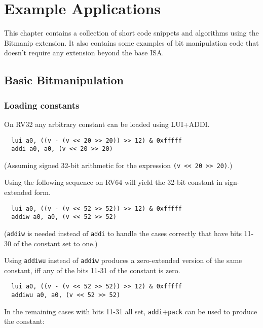 \chapter{Example Applications}

This chapter contains a collection of short code snippets and algorithms using
the Bitmanip extension. It also contains some examples of bit manipulation
code that doesn't require any extension beyond the base ISA.


\section{Basic Bitmanipulation}


\subsection{Loading constants}

On RV32 any arbitrary constant can be loaded using LUI+ADDI.

\begin{verbatim}
  lui a0, ((v - (v << 20 >> 20)) >> 12) & 0xfffff
  addi a0, a0, (v << 20 >> 20)
\end{verbatim}

(Assuming signed 32-bit arithmetic for the expression {\tt (v << 20 >> 20)}.)

Using the following sequence on RV64 will yield the 32-bit constant in sign-extended
form.

\begin{verbatim}
  lui a0, ((v - (v << 52 >> 52)) >> 12) & 0xfffff
  addiw a0, a0, (v << 52 >> 52)
\end{verbatim}

({\tt addiw} is needed instead of {\tt addi} to handle the cases correctly that have
bits 11-30 of the constant set to one.)

Using {\tt addiwu} instead of {\tt addiw} produces a zero-extended version of
the same constant, iff any of the bits 11-31 of the constant is zero.

\begin{verbatim}
  lui a0, ((v - (v << 52 >> 52)) >> 12) & 0xfffff
  addiwu a0, a0, (v << 52 >> 52)
\end{verbatim}

In the remaining cases with bits 11-31 all set, {\tt addi}+{\tt pack}
can be used to produce the constant:

